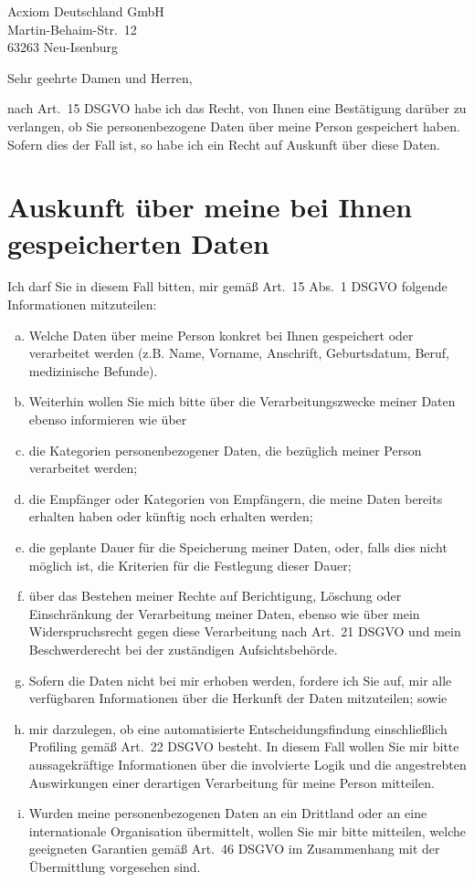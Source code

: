 \documentclass[a4paper,DIV=11]{scrartcl}
\newcommand{\includepostage}[1]{%
  \AddToShipoutPictureBG*{%
    \put(\LenToUnit{11mm},\LenToUnit{-85mm}){%
      \texttt{[image: \#1]}}}}
\begin{document}
\begin{letter}{%
Acxiom Deutschland GmbH\\
Martin-Behaim-Str.\ 12\\
63263 Neu-Isenburg
}
\opening{Sehr geehrte Damen und Herren,}

nach Art.\ 15 DSGVO habe ich das Recht, von Ihnen eine Bestätigung darüber zu verlangen, ob Sie personenbezogene Daten über meine Person gespeichert haben. Sofern dies der Fall ist, so habe ich ein Recht auf Auskunft über diese Daten.

\section{Auskunft über meine bei Ihnen gespeicherten Daten}

Ich darf Sie in diesem Fall bitten, mir gemäß Art.\ 15 Abs.\ 1 DSGVO folgende Informationen mitzuteilen:
\begin{enumerate}[(a)]
\item Welche Daten über meine Person konkret bei Ihnen gespeichert oder verarbeitet werden (z.B. Name, Vorname, Anschrift, Geburtsdatum, Beruf, medizinische Befunde).
\item Weiterhin wollen Sie mich bitte über die Verarbeitungszwecke meiner Daten ebenso informieren wie über
\item die Kategorien personenbezogener Daten, die bezüglich meiner Person verarbeitet werden;
\item die Empfänger oder Kategorien von Empfängern, die meine Daten bereits erhalten haben oder künftig noch erhalten werden;
\item die geplante Dauer für die Speicherung meiner Daten, oder, falls dies nicht möglich ist, die Kriterien für die Festlegung dieser Dauer;
\item über das Bestehen meiner Rechte auf Berichtigung, Löschung oder Einschränkung der Verarbeitung meiner Daten, ebenso wie über mein Widerspruchsrecht gegen diese Verarbeitung nach Art.\ 21 DSGVO und mein Beschwerderecht bei der zuständigen Aufsichtsbehörde.
\item Sofern die Daten nicht bei mir erhoben werden, fordere ich Sie auf, mir alle verfügbaren Informationen über die Herkunft der Daten mitzuteilen; sowie
\item mir darzulegen, ob eine automatisierte Entscheidungsfindung einschließlich Profiling gemäß Art.\ 22 DSGVO besteht. In diesem Fall wollen Sie mir bitte aussagekräftige Informationen über die involvierte Logik und die angestrebten Auswirkungen einer derartigen Verarbeitung für meine Person mitteilen.
\item Wurden meine personenbezogenen Daten an ein Drittland oder an eine internationale Organisation übermittelt, wollen Sie mir bitte mitteilen, welche geeigneten Garantien gemäß Art.\ 46 DSGVO im Zusammenhang mit der Übermittlung vorgesehen sind.
\end{enumerate}


\end{letter}
\end{document}
